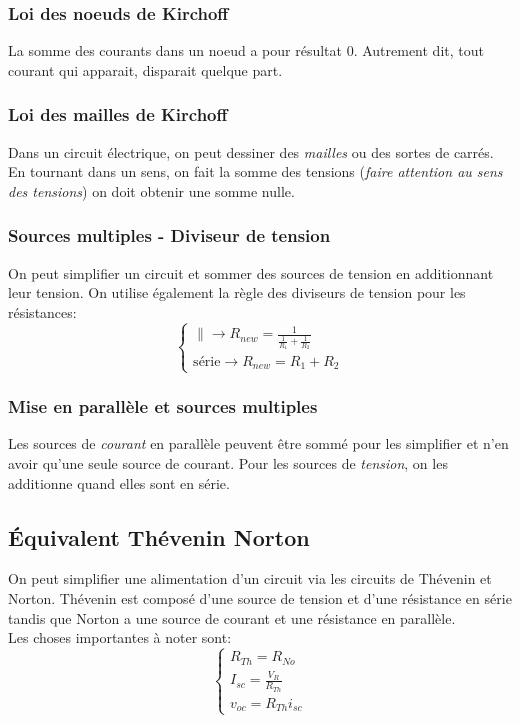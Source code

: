 \documentclass{report}
\begin{document}
\subsubsection{Loi des noeuds de Kirchoff}
La somme des courants dans un noeud a pour résultat 0. Autrement dit, tout courant qui apparait, disparait quelque part.

\subsubsection{Loi des mailles de Kirchoff}
Dans un circuit électrique, on peut dessiner des \textit{mailles} ou des sortes de carrés. En tournant dans un sens, on fait la somme des tensions (\textit{faire attention au sens des tensions}) on doit obtenir une somme nulle.

\subsubsection{Sources multiples - Diviseur de tension}
On peut simplifier un circuit et sommer des sources de tension en additionnant leur tension. On utilise également la règle des diviseurs de tension pour les résistances:
\begin{equation}
\begin{cases}
\parallel \rightarrow R_{new} = \frac{1}{\frac{1}{R_1}+\frac{1}{R_2}}\\
\text{série} \rightarrow R_{new} = R_1 + R_2
\end{cases}
\end{equation}

\subsubsection{Mise en parallèle et sources multiples}
Les sources de \textit{courant} en parallèle peuvent être sommé pour les simplifier et n'en avoir qu'une seule source de courant. Pour les sources de \textit{tension}, on les additionne quand elles sont en série.

\subsection{Équivalent Thévenin Norton} \label{Th}
On peut simplifier une alimentation d'un circuit via les circuits de Thévenin et Norton. Thévenin est composé d'une source de tension et d'une résistance en série tandis que Norton a une source de courant et une résistance en parallèle.\\
Les choses importantes à noter sont:
\begin{equation}
\begin{cases}
R_{Th} = R_{No}\\
I_{sc} = \frac{V_{R}}{R_{Th}}\\
v_{oc} = R_{Th}i_{sc}
\end{cases}
\end{equation}
 
\end{document}
